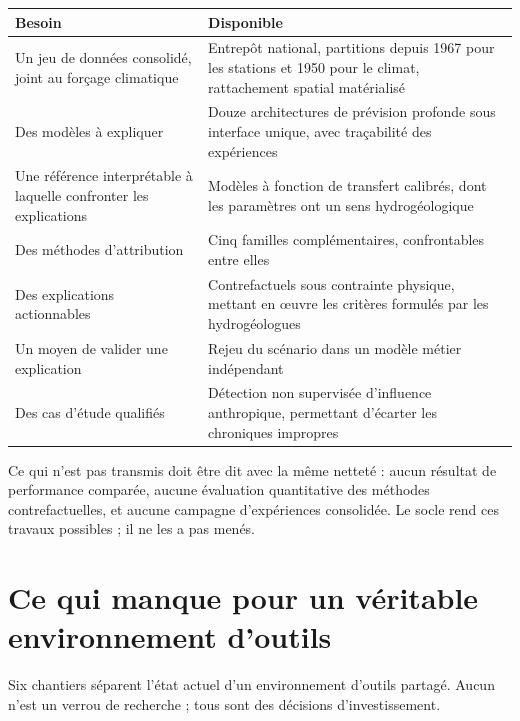 \begin{center}
\begin{tabularx}{\textwidth}{@{}p{4.6cm}X@{}}
\toprule
\textbf{Besoin} & \textbf{Disponible} \\
\midrule
Un jeu de données consolidé, joint au forçage climatique & Entrepôt national, partitions depuis
1967 pour les stations et 1950 pour le climat, rattachement spatial matérialisé \\
Des modèles à expliquer & Douze architectures de prévision profonde sous interface unique, avec
traçabilité des expériences \\
Une référence interprétable à laquelle confronter les explications & Modèles à fonction de
transfert calibrés, dont les paramètres ont un sens hydrogéologique \\
Des méthodes d'attribution & Cinq familles complémentaires, confrontables entre elles \\
Des explications actionnables & Contrefactuels sous contrainte physique, mettant en œuvre les
critères formulés par les hydrogéologues \\
Un moyen de valider une explication & Rejeu du scénario dans un modèle métier indépendant \\
Des cas d'étude qualifiés & Détection non supervisée d'influence anthropique, permettant
d'écarter les chroniques impropres \\
\bottomrule
\end{tabularx}
\end{center}

Ce qui n'est pas transmis doit être dit avec la même netteté : aucun résultat de performance
comparée, aucune évaluation quantitative des méthodes contrefactuelles, et aucune campagne
d'expériences consolidée. Le socle rend ces travaux possibles ; il ne les a pas menés.

\section{Ce qui manque pour un véritable environnement d'outils}

Six chantiers
séparent l'état actuel d'un environnement d'outils partagé. Aucun n'est un verrou de recherche ;
tous sont des décisions d'investissement.


